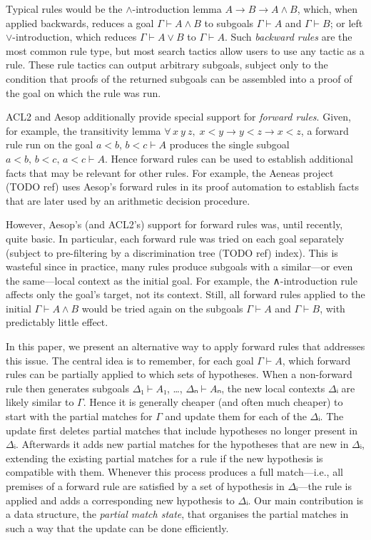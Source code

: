\documentclass[runningheads]{llncs}
\newcommand{\jcom}[1]{{\color{orange}{Jannis: #1}} }
\newcommand{\All}[2]{\ensuremath{\forall\, #1,\; #2}}
\begin{document}
Typical rules would be the $∧$-introduction lemma $A → B → A ∧ B$, which, when applied backwards, reduces a goal $Γ ⊢ A ∧ B$ to subgoals $Γ ⊢ A$ and $Γ ⊢ B$; or left $∨$-introduction, which reduces $Γ ⊢ A ∨ B$ to $Γ ⊢ A$.
Such \emph{backward rules} are the most common rule type, but most search tactics allow users to use any tactic as a rule.
These rule tactics can output arbitrary subgoals, subject only to the condition that proofs of the returned subgoals can be assembled into a proof of the goal on which the rule was run.

ACL2 and Aesop additionally provide special support for \emph{forward rules}.
Given, for example, the transitivity lemma $\All{x~y~z}{x < y → y < z → x < z}$, a forward rule run on the goal $a < b,\, b < c ⊢ A$ produces the single subgoal $a < b,\, b < c,\, a < c ⊢ A$.
Hence forward rules can be used to establish additional facts that may be relevant for other rules.
For example, the Aeneas project (TODO ref) uses Aesop's forward rules \jcom{(ensure that this is accurate)} in its proof automation to establish facts that are later used by an arithmetic decision procedure.

However, Aesop's (and ACL2's) support for forward rules was, until recently, quite basic.
In particular, each forward rule was tried on each goal separately (subject to pre-filtering by a discrimination tree (TODO ref) index).
This is wasteful since in practice, many rules produce subgoals with a similar---or even the same---local context as the initial goal.
For example, the ∧-introduction rule affects only the goal's target, not its context.
Still, all forward rules applied to the initial $Γ ⊢ A ∧ B$ would be tried again on the subgoals $Γ ⊢ A$ and $Γ ⊢ B$, with predictably little effect.

In this paper, we present an alternative way to apply forward rules that addresses this issue.
The central idea is to remember, for each goal $Γ ⊢ A$, which forward rules can be partially applied to which sets of hypotheses.
When a non-forward rule then generates subgoals $Δ₁ ⊢ A₁$, \dots, $Δₙ ⊢ Aₙ$, the new local contexts $Δᵢ$ are likely similar to $Γ$.
Hence it is generally cheaper (and often much cheaper) to start with the partial matches for $Γ$ and update them for each of the $Δᵢ$.
The update first deletes partial matches that include hypotheses no longer present in $Δᵢ$.
Afterwards it adds new partial matches for the hypotheses that are new in $Δᵢ$, extending the existing partial matches for a rule if the new hypothesis is compatible with them.
Whenever this process produces a full match---i.e., all premises of a forward rule are satisfied by a set of hypothesis in $Δᵢ$---the rule is applied and adds a corresponding new hypothesis to $Δᵢ$.
Our main contribution is a data structure, the \emph{partial match state}, that organises the partial matches in such a way that the update can be done efficiently.
\end{document}
